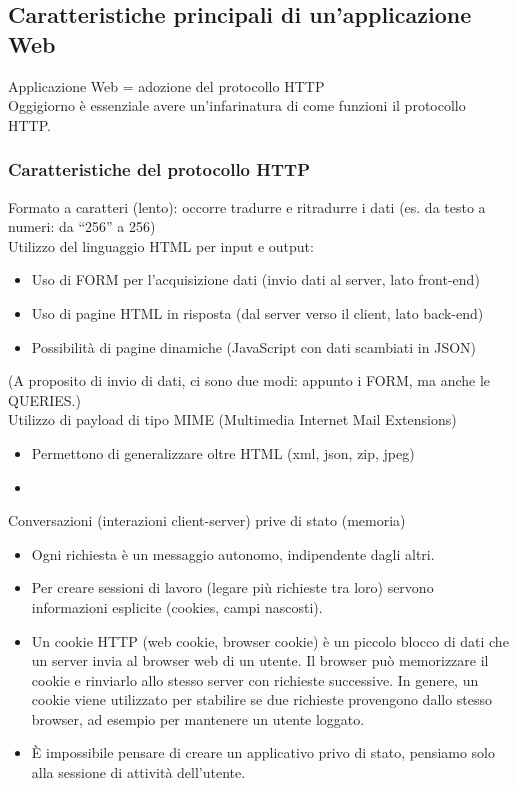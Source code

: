 \subsection{Caratteristiche principali di un'applicazione Web}
Applicazione Web = adozione del protocollo HTTP
\\Oggigiorno è essenziale avere un'infarinatura di come funzioni il protocollo HTTP.
\subsubsection{Caratteristiche del protocollo HTTP}
Formato a caratteri (lento): occorre tradurre e ritradurre i dati (es. da testo a numeri: da “256” a 256)
\\Utilizzo del linguaggio HTML per input e output:
\begin{itemize}
    \item Uso di FORM per l'acquisizione dati (invio dati al server, lato front-end)
    \item Uso di pagine HTML in risposta (dal server verso il client, lato back-end)
    \item Possibilità di pagine dinamiche (JavaScript con dati scambiati in JSON)
\end{itemize}
(A proposito di invio di dati, ci sono due modi: appunto i FORM, ma anche le QUERIES.)
\\Utilizzo di payload di tipo MIME (Multimedia Internet Mail Extensions)
\begin{itemize}
    \item Permettono di generalizzare oltre HTML (xml, json, zip, jpeg)
    \item 
\end{itemize}
Conversazioni (interazioni client-server) prive di stato (memoria)
\begin{itemize}
    \item Ogni richiesta è un messaggio autonomo, indipendente dagli altri.
    \item Per creare sessioni di lavoro (legare più richieste tra loro) servono informazioni esplicite (cookies, campi nascosti).
    \item Un cookie HTTP (web cookie, browser cookie) è un piccolo blocco di dati che un server invia al browser web di un utente. Il browser può memorizzare il cookie e rinviarlo allo stesso server con richieste successive. In genere, un cookie viene utilizzato per stabilire se due richieste provengono dallo stesso browser, ad esempio per mantenere un utente loggato.
    \item \`E impossibile pensare di creare un applicativo privo di stato, pensiamo solo alla sessione di attività dell'utente.
\end{itemize}

